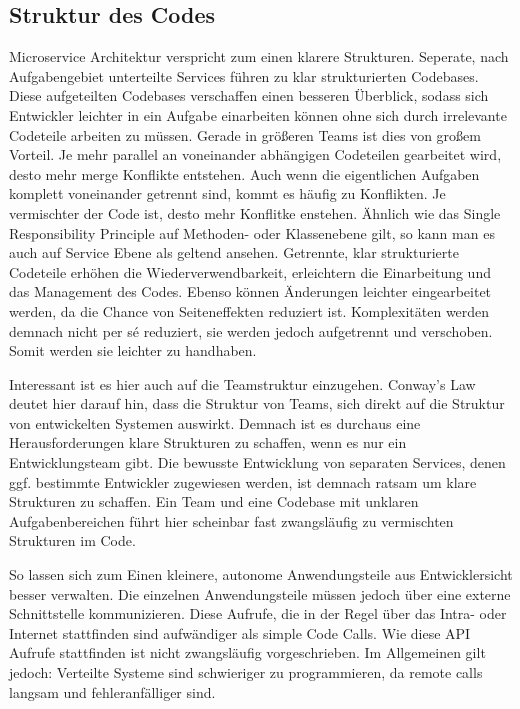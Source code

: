 \subsection{Struktur des Codes}
Microservice Architektur verspricht zum einen klarere Strukturen. Seperate, nach Aufgabengebiet unterteilte Services führen zu klar strukturierten Codebases. Diese aufgeteilten Codebases verschaffen einen besseren Überblick, sodass sich Entwickler leichter in ein Aufgabe einarbeiten können ohne sich durch irrelevante Codeteile arbeiten zu müssen. Gerade in größeren Teams ist dies von großem Vorteil. Je mehr parallel an voneinander abhängigen Codeteilen gearbeitet wird, desto mehr merge Konflikte entstehen. Auch wenn die eigentlichen Aufgaben komplett voneinander getrennt sind, kommt es häufig zu Konflikten. Je vermischter der Code ist, desto mehr Konflitke enstehen. Ähnlich wie das Single Responsibility Principle auf Methoden- oder Klassenebene gilt, so kann man es auch auf Service Ebene als geltend ansehen. Getrennte, klar strukturierte Codeteile erhöhen die Wiederverwendbarkeit, erleichtern die Einarbeitung und das Management des Codes. Ebenso können Änderungen leichter eingearbeitet werden, da die Chance von Seiteneffekten reduziert ist. Komplexitäten werden demnach nicht per sé reduziert, sie werden jedoch aufgetrennt und verschoben. Somit werden sie leichter zu handhaben.

Interessant ist es hier auch auf die Teamstruktur einzugehen. Conway's Law\cite{conwayslaw} deutet hier darauf hin, dass die Struktur von Teams, sich direkt auf die Struktur von entwickelten Systemen auswirkt. Demnach ist es durchaus eine Herausforderungen klare Strukturen zu schaffen, wenn es nur ein Entwicklungsteam gibt. Die bewusste Entwicklung von separaten Services, denen ggf. bestimmte Entwickler zugewiesen werden, ist demnach ratsam um klare Strukturen zu schaffen. Ein Team und eine Codebase mit unklaren Aufgabenbereichen führt hier scheinbar fast zwangsläufig zu vermischten Strukturen im Code.

So lassen sich zum Einen kleinere, autonome Anwendungsteile aus Entwicklersicht besser verwalten. Die einzelnen Anwendungsteile müssen jedoch über eine externe Schnittstelle kommunizieren. Diese Aufrufe, die in der Regel über das Intra- oder Internet stattfinden sind aufwändiger als simple Code Calls. Wie diese API Aufrufe stattfinden ist nicht zwangsläufig vorgeschrieben. Im Allgemeinen gilt jedoch: Verteilte Systeme sind schwieriger zu programmieren, da remote calls langsam und fehleranfälliger sind.~\cite[vgl.][]{Fowler:Guide}

